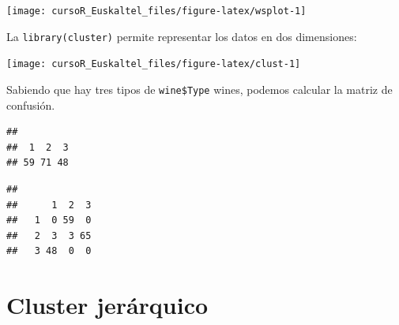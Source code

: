 \documentclass[]{book}
\newenvironment{Shaded}{\begin{snugshade}}{\end{snugshade}}
\newcommand{\KeywordTok}[1]{\textcolor[rgb]{0.13,0.29,0.53}{\textbf{#1}}}
\newcommand{\DataTypeTok}[1]{\textcolor[rgb]{0.13,0.29,0.53}{#1}}
\newcommand{\DecValTok}[1]{\textcolor[rgb]{0.00,0.00,0.81}{#1}}
\newcommand{\StringTok}[1]{\textcolor[rgb]{0.31,0.60,0.02}{#1}}
\newcommand{\OtherTok}[1]{\textcolor[rgb]{0.56,0.35,0.01}{#1}}
\newcommand{\OperatorTok}[1]{\textcolor[rgb]{0.81,0.36,0.00}{\textbf{#1}}}
\newcommand{\NormalTok}[1]{#1}
\begin{document}
\begin{center}\texttt{[image: cursoR\_Euskaltel\_files/figure-latex/wsplot-1]} \end{center}

La \texttt{library(cluster)} permite representar los datos en dos
dimensiones:

\begin{Shaded}
\end{Shaded}

\begin{center}\texttt{[image: cursoR\_Euskaltel\_files/figure-latex/clust-1]} \end{center}

Sabiendo que hay tres tipos de \texttt{wine\$Type} wines, podemos
calcular la matriz de confusión.

\begin{Shaded}
\end{Shaded}

\begin{verbatim}
## 
##  1  2  3 
## 59 71 48
\end{verbatim}

\begin{Shaded}
\end{Shaded}

\begin{verbatim}
##    
##      1  2  3
##   1  0 59  0
##   2  3  3 65
##   3 48  0  0
\end{verbatim}

\section{Cluster jerárquico}\label{cluster-jerarquico}
\end{document}
